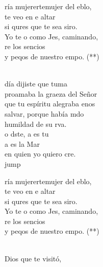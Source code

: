 \begin{cancion}%
	\begin{chorus}%
	ría mujerertemujer del eblo,\\
	 te veo en e altar\\
	si qures que te sea siro.\\
	Yo te o como Jes, caminando, \\
	re los sencios \\
	y peqos de nuestro empo. (**) \\
	\end{chorus}%
	\jump\\
	 día dijiste que tuma\\
	proamaba la graeza del Señor\\
	que tu espíritu alegraba enos\\
	 salvar, porque había mdo\\
	humildad de su rva.  \\
	o dste, a es tu \\
	a es la Mar \\
	en quien yo quiero cre.\\jump\\
	\begin{chorus}%
	ría mujerertemujer del eblo,\\
	 te veo en e altar\\
	si qures que te sea siro.\\
	Yo te o como Jes, caminando, \\
	re los sencios \\
	y peqos de nuestro empo. (**) \\
	\end{chorus}%
	\jump\\
	 Dios que te visitó,\\

\end{cancion}

